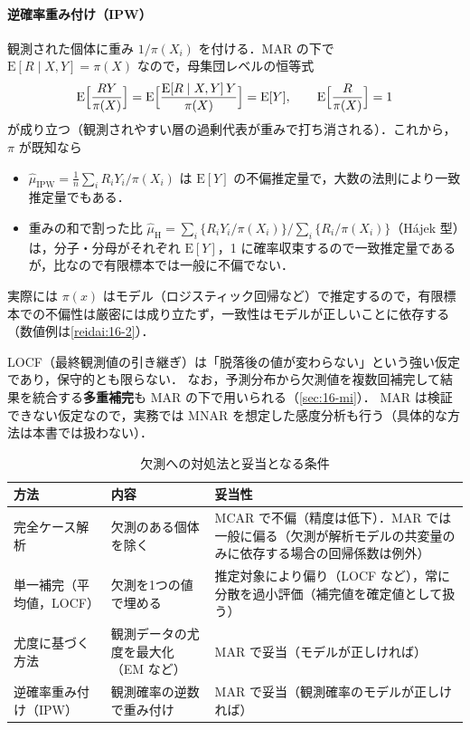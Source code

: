 \documentclass[a4paper,11pt,openany]{ltjsbook}
\newcommand{\tagbox}[2]{\tcbox[on line,boxsep=0.5pt,left=2pt,right=2pt,top=0.5pt,bottom=0.5pt,
  colframe=#1,colback=#1!10,boxrule=0.4pt,arc=1pt]{\scriptsize\bfseries\textcolor{#1}{#2}}}
\newcommand{\Youchui}{\tagbox{bkpurple}{要注意}}
\newcommand{\E}{\mathrm{E}}
\begin{document}
\paragraph{逆確率重み付け（IPW）}
観測された個体に重み $1/\pi(X_i)$ を付ける．MAR の下で $\E[R\mid X,Y]=\pi(X)$ なので，母集団レベルの恒等式
\[
\E\Bigl[\frac{RY}{\pi(X)}\Bigr]=\E\Bigl[\frac{\E[R\mid X,Y]\,Y}{\pi(X)}\Bigr]=\E[Y],\qquad \E\Bigl[\frac{R}{\pi(X)}\Bigr]=1
\]
が成り立つ（観測されやすい層の過剰代表が重みで打ち消される）．これから，$\pi$ が既知なら
\begin{itemize}
\item $\hat\mu_{\mathrm{IPW}}=\frac1n\sum_iR_iY_i/\pi(X_i)$ は $\E[Y]$ の不偏推定量で，大数の法則により一致推定量でもある．
\item 重みの和で割った比 $\hat\mu_{\mathrm{H}}=\sum_i\{R_iY_i/\pi(X_i)\}\big/\sum_i\{R_i/\pi(X_i)\}$（Hájek 型）は，分子・分母がそれぞれ $\E[Y]$，1 に確率収束するので一致推定量であるが，比なので有限標本では一般に不偏でない．
\end{itemize}
実際には $\pi(x)$ はモデル（ロジスティック回帰など）で推定するので，有限標本での不偏性は厳密には成り立たず，一致性はモデルが正しいことに依存する（数値例は\cref{reidai:16-2}）．

\Youchui LOCF（最終観測値の引き継ぎ）は「脱落後の値が変わらない」という強い仮定であり，保守的とも限らない．
なお，予測分布から欠測値を複数回補完して結果を統合する\textbf{多重補完}も MAR の下で用いられる（\cref{sec:16-mi}）．
MAR は検証できない仮定なので，実務では MNAR を想定した感度分析も行う（具体的な方法は本書では扱わない）．

\begin{table}[htbp]
\centering\small
\caption{欠測への対処法と妥当となる条件}\label{tab:16-methods}
\begin{tabular}{@{}lL{48mm}L{52mm}@{}}
\toprule
方法 & 内容 & 妥当性\\
\midrule
完全ケース解析 & 欠測のある個体を除く & MCAR で不偏（精度は低下）．MAR では一般に偏る（欠測が解析モデルの共変量のみに依存する場合の回帰係数は例外）\\
単一補完（平均値，LOCF） & 欠測を1つの値で埋める & 推定対象により偏り（LOCF など），常に分散を過小評価（補完値を確定値として扱う）\\
尤度に基づく方法 & 観測データの尤度を最大化（EM など） & MAR で妥当（モデルが正しければ）\\
逆確率重み付け（IPW） & 観測確率の逆数で重み付け & MAR で妥当（観測確率のモデルが正しければ）\\
\bottomrule
\end{tabular}
\end{table}
\end{document}
